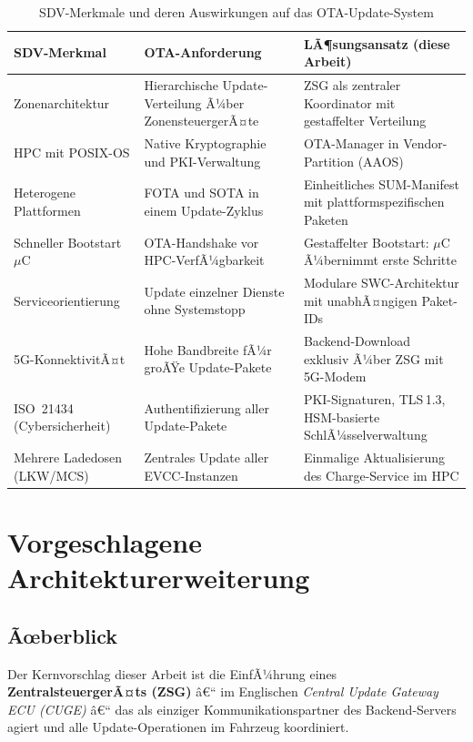 ﻿\documentclass[12pt,a4paper,twoside]{article}
\begin{document}
\begin{table}[h]
  \centering
  \caption{SDV-Merkmale und deren Auswirkungen auf das OTA-Update-System}
  \label{tab:sdv_ota_impact}
  \begin{tabularx}{\textwidth}{lXX}
    \toprule
    \textbf{SDV-Merkmal} & \textbf{OTA-Anforderung} & \textbf{LÃ¶sungsansatz (diese Arbeit)} \\
    \midrule
    Zonenarchitektur & Hierarchische Update-Verteilung Ã¼ber ZonensteuergerÃ¤te
      & ZSG als zentraler Koordinator mit gestaffelter Verteilung \\
    HPC mit POSIX-OS & Native Kryptographie und PKI-Verwaltung
      & OTA-Manager in Vendor-Partition (AAOS) \\
    Heterogene Plattformen & FOTA und SOTA in einem Update-Zyklus
      & Einheitliches SUM-Manifest mit plattformspezifischen Paketen \\
    Schneller Bootstart $\mu$C & OTA-Handshake vor HPC-VerfÃ¼gbarkeit
      & Gestaffelter Bootstart: $\mu$C Ã¼bernimmt erste Schritte \\
    Serviceorientierung & Update einzelner Dienste ohne Systemstopp
      & Modulare SWC-Architektur mit unabhÃ¤ngigen Paket-IDs \\
    5G-KonnektivitÃ¤t & Hohe Bandbreite fÃ¼r groÃŸe Update-Pakete
      & Backend-Download exklusiv Ã¼ber ZSG mit 5G-Modem \\
    ISO~21434 (Cybersicherheit) & Authentifizierung aller Update-Pakete
      & PKI-Signaturen, TLS\,1.3, HSM-basierte SchlÃ¼sselverwaltung \\
    Mehrere Ladedosen (LKW/MCS) & Zentrales Update aller EVCC-Instanzen
      & Einmalige Aktualisierung des Charge-Service im HPC \\
    \bottomrule
  \end{tabularx}
\end{table}


\section{Vorgeschlagene Architekturerweiterung}
\label{sec:architektur}


\subsection{Ãœberblick}

Der Kernvorschlag dieser Arbeit ist die EinfÃ¼hrung eines
\textbf{ZentralsteuergerÃ¤ts (ZSG)} â€“ im Englischen \textit{Central Update
Gateway ECU (CUGE)} â€“ das als einziger Kommunikationspartner des
Backend-Servers agiert und alle Update-Operationen im Fahrzeug koordiniert.
\end{document}

